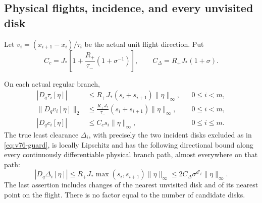 \subsection{Physical flights, incidence, and every unvisited disk}
Let $v_i=(x_{i+1}-x_i)/\tau_i$ be the actual unit flight direction.
Put
\begin{equation}\label{eq:el-observable-constants}
 C_c=J_*\left[1+\frac{R_+}{\tau_-}(1+\sigma^{-1})\right],\qquad
 C_\Delta=R_+J_*(1+\sigma).
\end{equation}

\begin{proposition}
\label{prop:el-observables}
On each actual regular branch,
\begin{align}
 |D_q\tau_i[\eta]|&\leq R_+J_*(s_i+s_{i+1})\|\eta\|_\infty,
                                      &&0\leq i<m,\label{eq:el-flight}\\
 \|D_qv_i[\eta]\|_2&\leq\frac{R_+J_*}{\tau_-}
                (s_i+s_{i+1})\|\eta\|_\infty,
                                      &&0\leq i<m,\label{eq:el-direction}\\
 |D_qc_i[\eta]|&\leq C_cs_i\|\eta\|_\infty,
                                      &&0\leq i\leq m.\label{eq:el-incidence}
\end{align}
The true least clearance $\Delta_i$, with precisely the two incident
disks excluded as in \eqref{eq:v76-guard}, is locally Lipschitz and has
the following directional bound along every continuously differentiable
physical branch path, almost everywhere on that path:
\begin{equation}\label{eq:el-clearance}
 |D_q\Delta_i[\eta]|\leq
 R_+J_*\max(s_i,s_{i+1})\|\eta\|_\infty
 \leq 2C_\Delta\sigma^{d'_i}\|\eta\|_\infty.
\end{equation}
The last assertion includes changes of the nearest unvisited disk and
of its nearest point on the flight. There is no factor equal to the
number of candidate disks.
\end{proposition}
